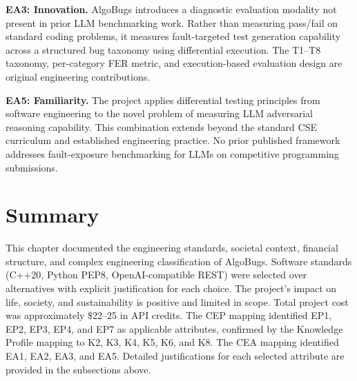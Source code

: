 \textbf{EA3: Innovation.} AlgoBugs introduces a diagnostic evaluation modality not present in prior LLM benchmarking work. Rather than measuring pass/fail on standard coding problems, it measures fault-targeted test generation capability across a structured bug taxonomy using differential execution. The T1--T8 taxonomy, per-category FER metric, and execution-based evaluation design are original engineering contributions.

\textbf{EA5: Familiarity.} The project applies differential testing principles from software engineering to the novel problem of measuring LLM adversarial reasoning capability. This combination extends beyond the standard CSE curriculum and established engineering practice. No prior published framework addresses fault-exposure benchmarking for LLMs on competitive programming submissions.

\section{Summary}

This chapter documented the engineering standards, societal context, financial structure, and complex engineering classification of AlgoBugs. Software standards (C++20, Python PEP8, OpenAI-compatible REST) were selected over alternatives with explicit justification for each choice. The project's impact on life, society, and sustainability is positive and limited in scope. Total project cost was approximately \$22--25 in API credits. The CEP mapping identified EP1, EP2, EP3, EP4, and EP7 as applicable attributes, confirmed by the Knowledge Profile mapping to K2, K3, K4, K5, K6, and K8. The CEA mapping identified EA1, EA2, EA3, and EA5. Detailed justifications for each selected attribute are provided in the subsections above.
